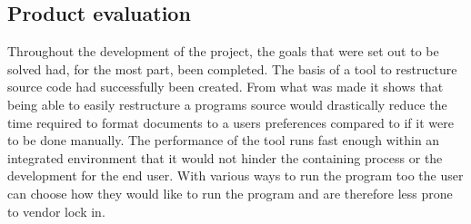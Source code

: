 \subsection{Product evaluation}

Throughout the development of the project, the goals that were set out to be solved had, for the most part, been completed. The basis of a tool to restructure source code had successfully been created. From what was made it shows that being able to easily restructure a programs source would drastically reduce the time required to format documents to a users preferences compared to if it were to be done manually.
The performance of the tool runs fast enough within an integrated environment that it would not hinder the containing process or the development for the end user.
With various ways to run the program too the user can choose how they would like to run the program and are therefore less prone to vendor lock in.
